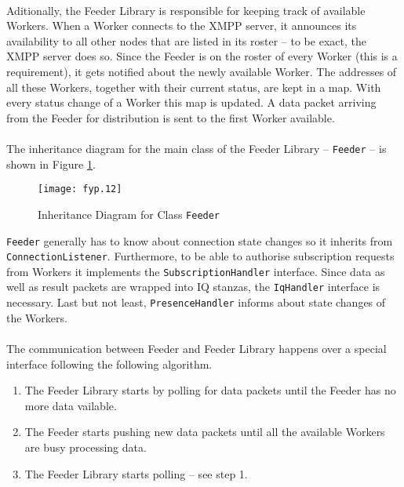\paragraph{}
Aditionally, the Feeder Library is responsible for keeping track of available Workers. When a Worker connects to the XMPP server, it announces its availability to all other nodes that are listed in its roster -- to be exact, the XMPP server does so. Since the Feeder is on the roster of every Worker (this is a requirement), it gets notified about the newly available Worker. The addresses of all these Workers, together with their current status, are kept in a map. With every status change of a Worker this map is updated. A data packet arriving from the Feeder for distribution is sent to the first Worker available.

\paragraph{}
The inheritance diagram for the main class of the Feeder Library -- \texttt{Feeder} -- is shown in Figure \ref{fig:inhfeeder}.

\begin{figure}[H]
\begin{center}
\texttt{[image: fyp.12]}
\end{center}
\caption{Inheritance Diagram for Class \texttt{Feeder}}
\label{fig:inhfeeder}
\end{figure}

\texttt{Feeder} generally has to know about connection state changes so it inherits from \texttt{ConnectionListener}. Furthermore, to be able to authorise subscription requests from Workers it implements the \texttt{SubscriptionHandler} interface. Since data as well as result packets are wrapped into IQ stanzas, the \texttt{IqHandler} interface is necessary. Last but not least, \texttt{PresenceHandler} informs about state changes of the Workers.

\paragraph{}
The communication between Feeder and Feeder Library happens over a special interface following the following algorithm.

\begin{enumerate}
\item The Feeder Library starts by polling for data packets until the Feeder has no more data vailable.
\item The Feeder starts pushing new data packets until all the available Workers are busy processing data.
\item The Feeder Library starts polling -- see step 1.
\end{enumerate}


